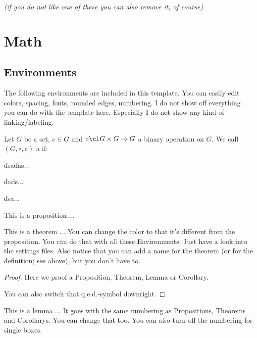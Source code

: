 \textsl{(if you do not like one of these you can also remove it, of course)}

\section{Math}

\subsection{Environments}

The following environments are included in this template. You can easily edit colors, spacing, fonts, rounded edges, numbering.
I do not show off everything you can do with the template here. Especially I do not show any kind of linking/labeling.

\begin{definition}[Group]
  Let $G$ be a set, $e \in G$ and $\circ \cl G \times G \to G$ a binary operation on $G$. We call $(G, \circ, e)$ a  if:
  \begin{axioms}[(G1)]
  \item dsadas...
  \item dads...
  \item dsa...
  \end{axioms}
\end{definition}

\begin{proposition}
  This is a proposition ...
\end{proposition}

\begin{theorem}
  This is a theorem ...
  You can change the color to that it's different from the proposition. You can do that with all these Environments. Just have a look into the settings files. Also notice that you can add a name for the theorem (or for the definition; see above), but you don't have to.
\end{theorem}

\begin{proof}
  Here we proof a Proposition, Theorem, Lemma or Corollary.

  You can also switch that q.e.d.-symbol downright.
\end{proof}

\begin{lemma}
  This is a lemma ...
  It goes with the same numbering as Propositions, Theorems and Corollarys. You can change that too. You can also turn off the numbering for single boxes.
\end{lemma}


